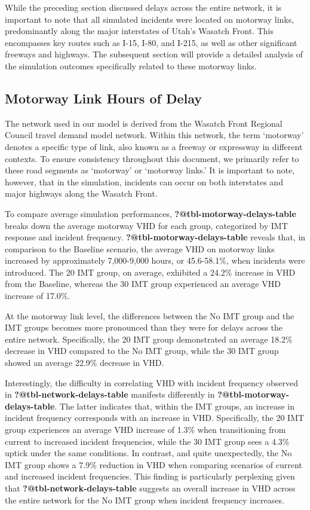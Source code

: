 \documentclass[fancy, oneside, mastersfancy, ms]{byuthesis}
\begin{document}
While the preceding section discussed delays across the entire network,
it is important to note that all simulated incidents were located on
motorway links, predominantly along the major interstates of Utah's
Wasatch Front. This encompasses key routes such as I-15, I-80, and
I-215, as well as other significant freeways and highways. The
subsequent section will provide a detailed analysis of the simulation
outcomes specifically related to these motorway links.

\hypertarget{sec-VHD-Motorway}{%
\subsection{Motorway Link Hours of Delay}\label{sec-VHD-Motorway}}

The network used in our model is derived from the Wasatch Front Regional
Council travel demand model network. Within this network, the term
`motorway' denotes a specific type of link, also known as a freeway or
expressway in different contexts. To ensure consistency throughout this
document, we primarily refer to these road segments as `motorway' or
`motorway links.' It is important to note, however, that in the
simulation, incidents can occur on both interstates and major highways
along the Wasatch Front.

To compare average simulation performances,
\textbf{?@tbl-motorway-delays-table} breaks down the average motorway
VHD for each group, categorized by IMT response and incident frequency.
\textbf{?@tbl-motorway-delays-table} reveals that, in comparison to the
Baseline scenario, the average VHD on motorway links increased by
approximately 7,000-9,000 hours, or 45.6-58.1\%, when incidents were
introduced. The 20 IMT group, on average, exhibited a 24.2\% increase in
VHD from the Baseline, whereas the 30 IMT group experienced an average
VHD increase of 17.0\%.

At the motorway link level, the differences between the No IMT group and
the IMT groups becomes more pronounced than they were for delays across
the entire network. Specifically, the 20 IMT group demonstrated an
average 18.2\% decrease in VHD compared to the No IMT group, while the
30 IMT group showed an average 22.9\% decrease in VHD.

Interestingly, the difficulty in correlating VHD with incident frequency
observed in \textbf{?@tbl-network-delays-table} manifests differently in
\textbf{?@tbl-motorway-delays-table}. The latter indicates that, within
the IMT groups, an increase in incident frequency corresponds with an
increase in VHD. Specifically, the 20 IMT group experiences an average
VHD increase of 1.3\% when transitioning from current to increased
incident frequencies, while the 30 IMT group sees a 4.3\% uptick under
the same conditions. In contrast, and quite unexpectedly, the No IMT
group shows a 7.9\% reduction in VHD when comparing scenarios of current
and increased incident frequencies. This finding is particularly
perplexing given that \textbf{?@tbl-network-delays-table} suggests an
overall increase in VHD across the entire network for the No IMT group
when incident frequency increases.
\end{document}
